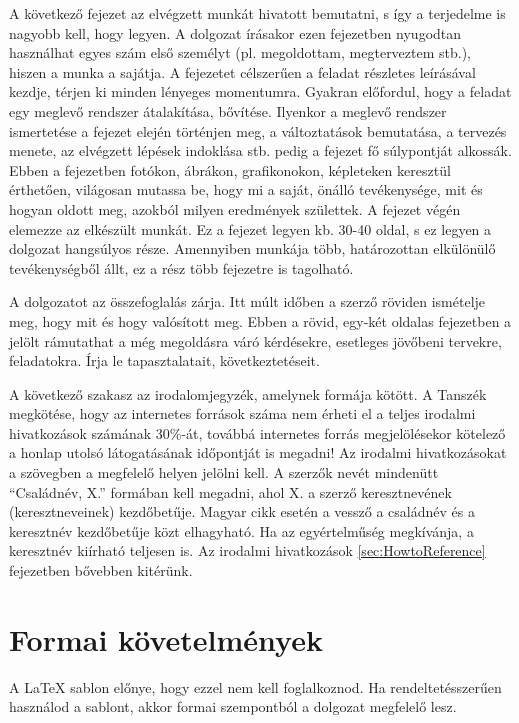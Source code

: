 A következő fejezet az elvégzett munkát hivatott bemutatni, s így a terjedelme is nagyobb kell, hogy legyen. A dolgozat írásakor ezen fejezetben nyugodtan használhat egyes szám első személyt (pl. megoldottam, megterveztem stb.), hiszen a munka a sajátja. A fejezetet célszerűen a feladat részletes leírásával kezdje, térjen ki minden lényeges momentumra. Gyakran előfordul, hogy a feladat egy meglevő rendszer átalakítása, bővítése. Ilyenkor a meglevő rendszer ismertetése a fejezet elején történjen meg, a változtatások bemutatása, a tervezés menete, az elvégzett lépések indoklása stb. pedig a fejezet fő súlypontját alkossák. Ebben a fejezetben fotókon, ábrákon, grafikonokon, képleteken keresztül érthetően, világosan mutassa be, hogy mi a saját, önálló tevékenysége, mit és hogyan oldott meg, azokból milyen eredmények születtek. A fejezet végén elemezze az elkészült munkát. Ez a fejezet legyen kb. 30-40 oldal, s ez legyen a dolgozat hangsúlyos része. Amennyiben munkája több, határozottan elkülönülő tevékenységből állt, ez a rész több fejezetre is tagolható.

A dolgozatot az összefoglalás zárja. Itt múlt időben a szerző röviden ismételje meg, hogy mit és hogy valósított meg. Ebben a rövid, egy-két oldalas fejezetben a jelölt rámutathat a még megoldásra váró kérdésekre, esetleges jövőbeni tervekre, feladatokra. Írja le tapasztalatait, következtetéseit.

A következő szakasz az irodalomjegyzék, amelynek formája kötött. A Tanszék megkötése, hogy az internetes források száma nem érheti el a teljes irodalmi hivatkozások számának 30\%-át, továbbá internetes forrás megjelölésekor kötelező a honlap utolsó látogatásának időpontját is megadni! Az irodalmi hivatkozásokat a szövegben a megfelelő helyen jelölni kell. A szerzők nevét mindenütt “Családnév, X.” formában kell megadni, ahol X. a szerző keresztnevének (keresztneveinek) kezdőbetűje. Magyar cikk esetén a vessző a családnév és a keresztnév kezdőbetűje közt elhagyható. Ha az egyértelműség megkívánja, a keresztnév kiírható teljesen is. Az irodalmi hivatkozások \ref{sec:HowtoReference} fejezetben bővebben kitérünk.

\section{Formai követelmények}
A \LaTeX{} sablon előnye, hogy ezzel nem kell foglalkoznod. Ha rendeltetésszerűen használod a sablont, akkor formai szempontból a dolgozat megfelelő lesz.

